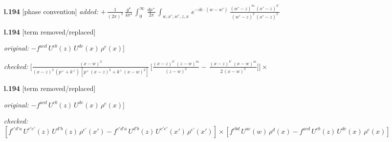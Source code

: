 \documentclass[10pt]{article}
\begin{document}
\begin{itemize}[leftmargin=2.2em,itemsep=1pt,topsep=2pt]
\item[\textbf{l.194}] \textsf{\small [phase convention]} \emph{added:} $\displaystyle +\,\frac{1}{(2\pi)^{3}}\,\frac{g^{4}}{4\pi^{4}}\,\int_{0}^{\infty}\, \frac{dp^{+}}{2\pi}\,\int_{w,x',w',z,x}\, e^{-ik\cdot (w-w')}\, \frac{(w'-z)^{m}\,(x'-z)^{k'}}{(w'-z)^{2}\,(x'-z)^{2}}\,$
\item[\textbf{l.194}] \textsf{\small [term removed/replaced]} \par\noindent\emph{original:} $\displaystyle -f^{acd}\,U^{cb}(z)\,U^{de}(x)\,\rho^{e}(x)]$\par\noindent\emph{checked:} $\displaystyle \Bigg[ \frac{(x-w)^{2}}{(x-z)^{2}\,(p^{+}+k^{+})\,[p^{+}\,(x-z)^{2}+k^{+}\,(x-w)^{2}]}\,\bigg[\frac{(x-z)^{k'}\,(z-w)^{m}}{(z-w)^{2}} -\,\frac{(x-z)^{k'}\,(x-w)^{m}}{2\,(x-w)^{2}}\bigg] \Bigg]\times\,$
\item[\textbf{l.194}] \textsf{\small [term removed/replaced]} \par\noindent\emph{original:} $\displaystyle -f^{acd}\,U^{cb}(z)\,U^{de}(x)\,\rho^{e}(x)]$\par\noindent\emph{checked:} $\displaystyle [f^{c'd'a}\,U^{c'e'}(z)\,U^{d'b}(z)\,\rho^{e'}(x')-f^{c'd'a}\, U^{d'b}(z)\,U^{c'e'}(x')\,\rho^{e'}(x')]\times [f^{cbd}\,U^{ac}(w)\,\rho^{d}(x) -f^{acd}\,U^{cb}(z)\,U^{de}(x)\,\rho^{e}(x)]$
\end{itemize}
\end{document}
